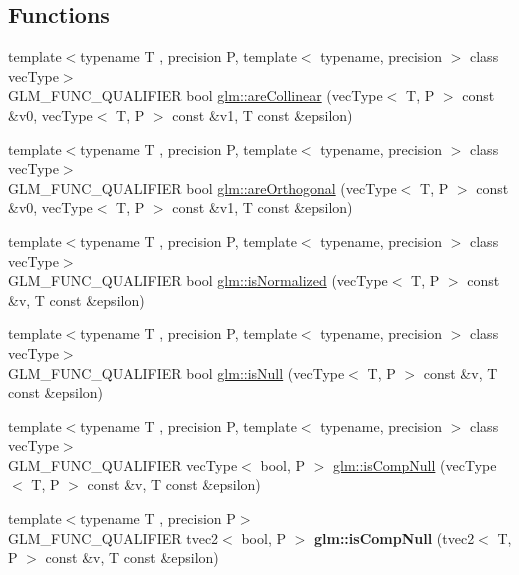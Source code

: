\subsection*{Functions}
\begin{DoxyCompactItemize}
\item 
{\footnotesize template$<$typename T , precision P, template$<$ typename, precision $>$ class vec\+Type$>$ }\\G\+L\+M\+\_\+\+F\+U\+N\+C\+\_\+\+Q\+U\+A\+L\+I\+F\+I\+ER bool \hyperlink{group__gtx__vector__query_ga465b844190d1740051e45d780832ea4c}{glm\+::are\+Collinear} (vec\+Type$<$ T, P $>$ const \&v0, vec\+Type$<$ T, P $>$ const \&v1, T const \&epsilon)
\item 
{\footnotesize template$<$typename T , precision P, template$<$ typename, precision $>$ class vec\+Type$>$ }\\G\+L\+M\+\_\+\+F\+U\+N\+C\+\_\+\+Q\+U\+A\+L\+I\+F\+I\+ER bool \hyperlink{group__gtx__vector__query_gaee10acefed397c11e01f2862e837754c}{glm\+::are\+Orthogonal} (vec\+Type$<$ T, P $>$ const \&v0, vec\+Type$<$ T, P $>$ const \&v1, T const \&epsilon)
\item 
{\footnotesize template$<$typename T , precision P, template$<$ typename, precision $>$ class vec\+Type$>$ }\\G\+L\+M\+\_\+\+F\+U\+N\+C\+\_\+\+Q\+U\+A\+L\+I\+F\+I\+ER bool \hyperlink{group__gtx__vector__query_ga6fa5fa2af67d14c205d24c49aad03270}{glm\+::is\+Normalized} (vec\+Type$<$ T, P $>$ const \&v, T const \&epsilon)
\item 
{\footnotesize template$<$typename T , precision P, template$<$ typename, precision $>$ class vec\+Type$>$ }\\G\+L\+M\+\_\+\+F\+U\+N\+C\+\_\+\+Q\+U\+A\+L\+I\+F\+I\+ER bool \hyperlink{group__gtx__vector__query_ga81a64edc1a2b470b82896592e89c523b}{glm\+::is\+Null} (vec\+Type$<$ T, P $>$ const \&v, T const \&epsilon)
\item 
{\footnotesize template$<$typename T , precision P, template$<$ typename, precision $>$ class vec\+Type$>$ }\\G\+L\+M\+\_\+\+F\+U\+N\+C\+\_\+\+Q\+U\+A\+L\+I\+F\+I\+ER vec\+Type$<$ bool, P $>$ \hyperlink{group__gtx__vector__query_ga93ecd4137480483ce1af0de8bbbf6546}{glm\+::is\+Comp\+Null} (vec\+Type$<$ T, P $>$ const \&v, T const \&epsilon)
\item 
\mbox{\label{vector__query_8inl_afc1ffd2beb09bb3c683b3606b2540519}} 
{\footnotesize template$<$typename T , precision P$>$ }\\G\+L\+M\+\_\+\+F\+U\+N\+C\+\_\+\+Q\+U\+A\+L\+I\+F\+I\+ER tvec2$<$ bool, P $>$ {\bfseries glm\+::is\+Comp\+Null} (tvec2$<$ T, P $>$ const \&v, T const \&epsilon)

\end{DoxyCompactItemize}
